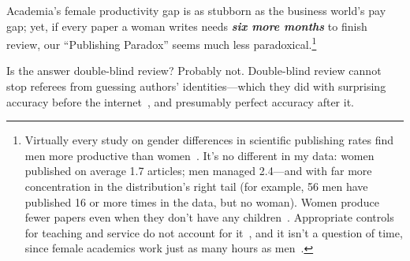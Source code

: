 Academia's female productivity gap is as stubborn as the business world's pay gap; yet, if every paper a woman writes needs \textbf{\emph{six more months}} to finish review, our ``Publishing Paradox'' seems much less paradoxical.\footnote{\label{footnote77}Virtually every study on gender differences in scientific publishing rates find men more productive than women~\citep[for a list, see][]{Ceci2014}. It's no different in my data: women published on average 1.7 articles; men managed 2.4---and with far more concentration in the distribution's right tail (for example, 56 men have published 16 or more times in the data, but no woman). Women produce fewer papers even when they don't have any children~\citep{Ceci2014}. Appropriate controls for teaching and service do not account for it~\citep{Xie2005}, and it isn't a question of time, since female academics work just as many hours as men~\citep{Ceci2014,Ecklund2011}.}

Is the answer double-blind review? Probably not. Double-blind review cannot stop referees from guessing authors' identities---which they did with surprising accuracy before the internet~\citep{Blank1991}, and presumably perfect accuracy after it.

